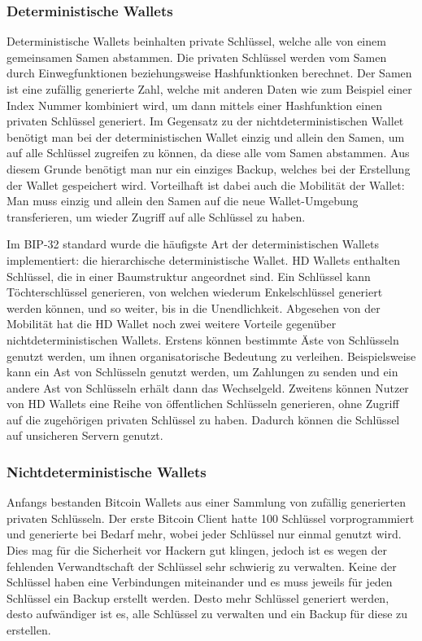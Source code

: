 \subsubsection{Deterministische Wallets}
Deterministische Wallets beinhalten private Schlüssel, welche alle von einem gemeinsamen Samen abstammen. Die privaten Schlüssel
werden vom Samen durch Einwegfunktionen beziehungsweise Hashfunktionken berechnet. Der Samen ist eine zufällig generierte Zahl,
welche mit anderen Daten wie zum Beispiel einer Index Nummer kombiniert wird, um dann mittels einer Hashfunktion einen privaten
Schlüssel generiert. Im Gegensatz zu der nichtdeterministischen Wallet benötigt man bei der deterministischen Wallet einzig und 
allein den Samen, um auf alle Schlüssel zugreifen zu können, da diese alle vom Samen abstammen. Aus diesem Grunde benötigt man
nur ein einziges Backup, welches bei der Erstellung der Wallet gespeichert wird. Vorteilhaft ist dabei auch die Mobilität der
Wallet: Man muss einzig und allein den Samen auf die neue Wallet-Umgebung transferieren, um wieder Zugriff auf alle Schlüssel
zu haben. 

Im BIP-32 standard wurde die häufigste Art der deterministischen Wallets implementiert: die hierarchische deterministische Wallet.
HD Wallets enthalten Schlüssel, die in einer Baumstruktur angeordnet sind. Ein Schlüssel kann Töchterschlüssel generieren, von 
welchen wiederum Enkelschlüssel generiert werden können, und so weiter, bis in die Unendlichkeit. Abgesehen von der Mobilität
hat die HD Wallet noch zwei weitere Vorteile gegenüber nichtdeterministischen Wallets. Erstens können bestimmte Äste von
Schlüsseln genutzt werden, um ihnen organisatorische Bedeutung zu verleihen. Beispielsweise kann ein Ast von Schlüsseln genutzt
werden, um Zahlungen zu senden und ein andere Ast von Schlüsseln erhält dann das Wechselgeld. Zweitens können Nutzer von HD
Wallets eine Reihe von öffentlichen Schlüsseln generieren, ohne Zugriff auf die zugehörigen privaten Schlüssel zu haben. Dadurch 
können die Schlüssel auf unsicheren Servern genutzt. 


\subsubsection{Nichtdeterministische Wallets}
Anfangs bestanden Bitcoin Wallets aus einer Sammlung von zufällig generierten privaten Schlüsseln. Der erste Bitcoin Client
hatte 100 Schlüssel vorprogrammiert und generierte bei Bedarf mehr, wobei jeder Schlüssel nur einmal genutzt wird. Dies mag
für die Sicherheit vor Hackern gut klingen, jedoch ist es wegen der fehlenden Verwandtschaft der Schlüssel sehr schwierig
zu verwalten. Keine der Schlüssel haben eine Verbindungen miteinander und es muss jeweils für jeden Schlüssel ein Backup
erstellt werden. Desto mehr Schlüssel generiert werden, desto aufwändiger ist es, alle Schlüssel zu verwalten und ein Backup
für diese zu erstellen.


